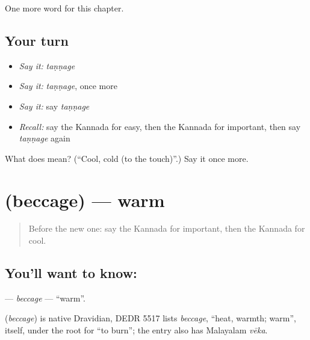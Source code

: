 \begin{grammarlens}[title={What you've built}]
One more word for this chapter.
\end{grammarlens}

\subsection*{Your turn}
\begin{itemize}
\raggedright
  \item \emph{Say it:} \emph{taṇṇage}
  \item \emph{Say it:} \emph{taṇṇage}, once more
  \item \emph{Say it:} say \emph{taṇṇage}
  \item \emph{Recall:} say the Kannada for easy, then the Kannada for important, then say \emph{taṇṇage} again
\end{itemize}

\begin{tcolorbox}[breakable,colback=teal!4,colframe=teal!35!black,title={Before you move on}]
What does  mean? (\textquotedblleft{}Cool, cold (to the touch)\textquotedblright{}.) Say it once more.
\end{tcolorbox}
\section[\texorpdfstring{\kn{ಬೆಚ್ಚಗೆ} (beccage)}{ಬೆಚ್ಚಗೆ (beccage)}]{ (beccage) — warm}

\label{lesson:KA-C291-beccage}



\begin{quote}
Before the new one: say the Kannada for important, then the Kannada for cool.
\end{quote}

\subsection*{You'll want to know: }
\textbf{} — \emph{beccage} — \textquotedblleft{}warm\textquotedblright{}.

\begin{cousinweb}
\textbf{} (\emph{beccage}) is native Dravidian, DEDR 5517 lists \emph{beccage}, \textquotedblleft{}heat, warmth; warm\textquotedblright{}, itself, under the root for \textquotedblleft{}to burn\textquotedblright{}; the entry also has Malayalam \emph{vēka}.
\end{cousinweb}

